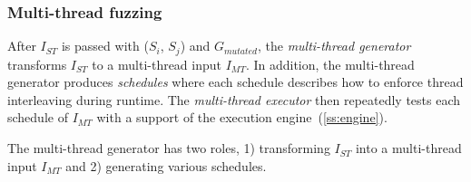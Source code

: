 

\subsubsection{Multi-thread fuzzing}
\label{sss:multithreadfuzzing}
%
After $I_{ST}$ is passed with ($S_i$, $S_j$) and
$G_{mutated}$, the \textit{multi-thread generator} transforms
$I_{ST}$ to a multi-thread input $I_{MT}$.
%
In addition, the multi-thread generator produces \textit{schedules}
where each schedule describes how to enforce thread interleaving
during runtime.
%
The \textit{multi-thread executor} then repeatedly tests each schedule
of $I_{MT}$ with a support of the execution
engine~(\autoref{ss:engine}).










%
%
%
%
%
The multi-thread generator has two roles, 1) transforming $I_{ST}$
into a multi-thread input $I_{MT}$ and 2) generating various
schedules.





